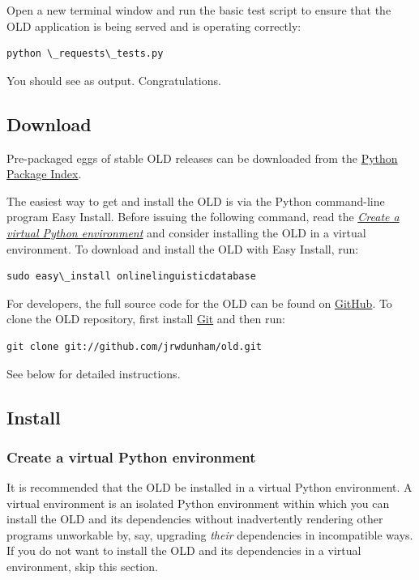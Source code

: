 \documentclass[letterpaper,10pt,english]{sphinxmanual}
\begin{document}
Open a new terminal window and run the basic test script to ensure that the OLD
application is being served and is operating correctly:

\begin{Verbatim}[commandchars=\\\{\}]
python \_requests\_tests.py
\end{Verbatim}

You should see  as output.  Congratulations.


\subsection{Download}
\label{installation:download}
Pre-packaged eggs of stable OLD releases can be downloaded from the
\href{http://pypi.python.org/pypi/onlinelinguisticdatabase}{Python Package Index}.

The easiest way to get and install the OLD is via the Python command-line
program Easy Install.  Before issuing the following command, read the
{\hyperref[installation:virtual-env]{\emph{Create a virtual Python environment}}} and consider installing the OLD in a virtual environment.
To download and install the OLD with Easy Install, run:

\begin{Verbatim}[commandchars=\\\{\}]
sudo easy\_install onlinelinguisticdatabase
\end{Verbatim}

For developers, the full source code for the OLD can be found on
\href{https://github.com/jrwdunham/old.}{GitHub}.  To clone the OLD repository,
first install \href{http://git-scm.com/}{Git} and then run:

\begin{Verbatim}[commandchars=\\\{\}]
git clone git://github.com/jrwdunham/old.git
\end{Verbatim}

See below for detailed instructions.


\subsection{Install}
\label{installation:install}

\subsubsection{Create a virtual Python environment}
\label{installation:create-a-virtual-python-environment}\label{installation:virtual-env}
It is recommended that the OLD be installed in a virtual Python environment.  A
virtual environment is an isolated Python environment within which you can
install the OLD and its dependencies without inadvertently rendering other
programs unworkable by, say, upgrading \emph{their} dependencies in incompatible
ways.  If you do not want to install the OLD and its dependencies in a virtual
environment, skip this section.
\end{document}
